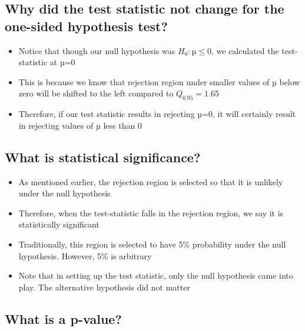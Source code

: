 \documentclass[
]{book}
\providecommand{\tightlist}{%
  \setlength{\itemsep}{0pt}\setlength{\parskip}{0pt}}
\begin{document}
\hypertarget{why-did-the-test-statistic-not-change-for-the-one-sided-hypothesis-test}{%
\subsection{Why did the test statistic not change for the one-sided hypothesis test?}\label{why-did-the-test-statistic-not-change-for-the-one-sided-hypothesis-test}}

\begin{itemize}
\tightlist
\item
  Notice that though our null hypothesis was \(H_0: µ ≤ 0\), we calculated the test-statistic at µ=0
\item
  This is because we know that rejection region under smaller values of µ below zero will be shifted to the left compared to \(Q_{0.95} = 1.65\)
\item
  Therefore, if our test statistic results in rejecting µ=0, it will certainly result in rejecting values of µ less than 0
\end{itemize}

\hypertarget{what-is-statistical-significance}{%
\subsection{What is statistical significance?}\label{what-is-statistical-significance}}

\begin{itemize}
\tightlist
\item
  As mentioned earlier, the rejection region is selected so that it is unlikely under the null hypothesis
\item
  Therefore, when the test-statistic falls in the rejection region, we say it is statistically significant
\item
  Traditionally, this region is selected to have 5\% probability under the null hypothesis. However, 5\% is arbitrary
\item
  Note that in setting up the test statistic, only the null hypothesis came into play. The alternative hypothesis did not matter
\end{itemize}

\hypertarget{what-is-a-p-value}{%
\subsection{What is a p-value?}\label{what-is-a-p-value}}
\end{document}
